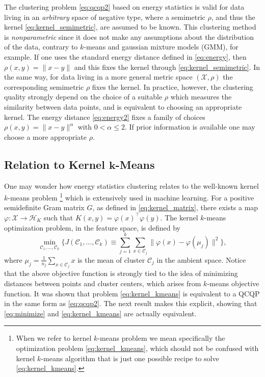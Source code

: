 \documentclass[aps,preprint,nofootinbib,floatfix]{revtex4-1}
\newcommand\kk{K}
\newcommand\HH{\mathcal{H}}
\newcommand\C{{\mathcal{C}}}
\begin{document}
The clustering problem \eqref{eq:qcqp2} based on energy statistics
is valid for data living in an \emph{arbitrary} space of negative type, where
a semimetric $\rho$, and thus the kernel \eqref{eq:kernel_semimetric}, are
assumed to be known. This clustering method is
\emph{nonparametric} since it does not make any assumptions
about  the distribution of the data, 
contrary to $k$-means and gaussian mixture models (GMM), for example.
If one uses the standard energy distance
defined in \eqref{eq:energy}, 
then $\rho(x,y) = \| x - y\|$ and this fixes the kernel
through \eqref{eq:kernel_semimetric}. In the same way, 
for data living in a more general
metric space $(\mathcal{X}, \rho)$ the corresponding semimetric $\rho$ fixes
the kernel.
In practice, however,
the clustering quality strongly depend on the choice of a suitable
$\rho$ which measures the similarity between data points,
and is equivalent to choosing an appropriate kernel.
The energy distance \eqref{eq:energy2} fixes a family of choices
$\rho(x,y) = \| x-y\|^\alpha$ with $0 < \alpha\le 2$. If prior information
is available one may choose a more appropriate $\rho$.

\subsection*{Relation to Kernel $\bm{k}$-Means}
One may wonder how energy statistics clustering 
relates to the well-known kernel $k$-means problem%
\footnote{When we refer to kernel $k$-means problem we mean specifically 
the optimization problem \eqref{eq:kernel_kmeans}, which should not be 
confused with kernel $k$-means algorithm that is just one possible recipe 
to solve \eqref{eq:kernel_kmeans}.
} 
which is extensively used in machine learning.
For a positive semidefinite Gram matrix $G$, as defined in
\eqref{eq:kernel_matrix},
there exists a map
$\varphi: \mathcal{X} \to \HH_\kk$ such that
$\kk(x,y) = \varphi(x)^\top \varphi(y)$. The kernel $k$-means optimization
problem,
in the feature space,
is defined by
\begin{equation}
\label{eq:kernel_kmeans}
\min_{\C_1,\dotsc,\C_k}\bigg\{ 
J(\C_1,\dots,\C_k) \equiv  \sum_{j=1}^k
\sum_{x \in \C_j} \| \varphi(x) - \varphi(\mu_j) \|^2
\bigg\},
\end{equation}
where $\mu_j = \tfrac{1}{n_j} \sum_{x \in \C_j} x$ is the  mean of cluster
$\C_j$ in the ambient space. Notice that the above objective function
is strongly tied to the idea of minimizing distances between points
and cluster centers, which arises from $k$-means objective function.
It was shown \cite{Dhillon2,Dhillon} 
that problem \eqref{eq:kernel_kmeans} 
is equivalent to a QCQP in the same form as
\eqref{eq:qcqp2}. The next result makes this explicit, showing that
\eqref{eq:minimize} and \eqref{eq:kernel_kmeans} are actually equivalent.
\end{document}
